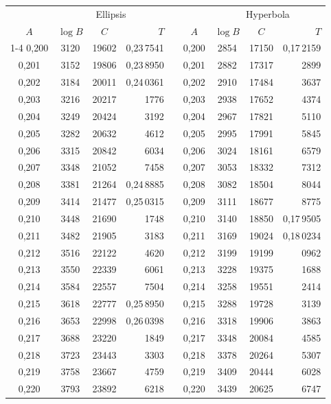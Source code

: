\begin{tabular}{|c|c|c|r|@{}p{9pt}@{}|c|c|c|r|}
\hline
 & \multicolumn{3}{c|}{Ellipsis} & & & \multicolumn{3}{c|}{Hyperbola} \\
\(A\) & \(\log B\) & \(C\) & \(T\) & & \(A\) & \(\log B\) & \(C\) & \(T\) \\
\cline{1-4}\cline{6-9}
0,200 & 3120 & 19602 & 0,23\,7541 &  & 0,200 & 2854 & 17150 & 0,17\,2159 \\
0,201 & 3152 & 19806 & 0,23\,8950 &  & 0,201 & 2882 & 17317 & 2899 \\
0,202 & 3184 & 20011 & 0,24\,0361 &  & 0,202 & 2910 & 17484 & 3637 \\
0,203 & 3216 & 20217 & 1776 &  & 0,203 & 2938 & 17652 & 4374 \\
0,204 & 3249 & 20424 & 3192 &  & 0,204 & 2967 & 17821 & 5110 \\
0,205 & 3282 & 20632 & 4612 &  & 0,205 & 2995 & 17991 & 5845 \\[3pt]
0,206 & 3315 & 20842 & 6034 &  & 0,206 & 3024 & 18161 & 6579 \\
0,207 & 3348 & 21052 & 7458 &  & 0,207 & 3053 & 18332 & 7312 \\
0,208 & 3381 & 21264 & 0,24\,8885 &  & 0,208 & 3082 & 18504 & 8044 \\
0,209 & 3414 & 21477 & 0,25\,0315 &  & 0,209 & 3111 & 18677 & 8775 \\
0,210 & 3448 & 21690 & 1748 &  & 0,210 & 3140 & 18850 & 0,17\,9505 \\[3pt]
0,211 & 3482 & 21905 & 3183 &  & 0,211 & 3169 & 19024 & 0,18\,0234 \\
0,212 & 3516 & 22122 & 4620 &  & 0,212 & 3199 & 19199 & 0962 \\
0,213 & 3550 & 22339 & 6061 &  & 0,213 & 3228 & 19375 & 1688 \\
0,214 & 3584 & 22557 & 7504 &  & 0,214 & 3258 & 19551 & 2414 \\
0,215 & 3618 & 22777 & 0,25\,8950 &  & 0,215 & 3288 & 19728 & 3139 \\[3pt]
0,216 & 3653 & 22998 & 0,26\,0398 &  & 0,216 & 3318 & 19906 & 3863 \\
0,217 & 3688 & 23220 & 1849 &  & 0,217 & 3348 & 20084 & 4585 \\
0,218 & 3723 & 23443 & 3303 &  & 0,218 & 3378 & 20264 & 5307 \\
0,219 & 3758 & 23667 & 4759 &  & 0,219 & 3409 & 20444 & 6028 \\
0,220 & 3793 & 23892 & 6218 &  & 0,220 & 3439 & 20625 & 6747 \\[3pt]

\end{tabular}
